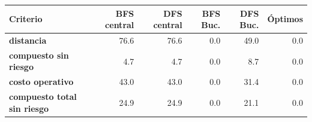 \renewcommand{\arraystretch}{1.2}
\begin{tabular}{|l|r|r|r|r|r|}
\hline
\rowcolor{gray!20} \textbf{Criterio} & \textbf{BFS central} & \textbf{DFS central} & \textbf{BFS Buc.} & \textbf{DFS Buc.} & \textbf{Óptimos} \\
\hline
\textbf{distancia} & 76.6 & 76.6 & 0.0 & 49.0 & 0.0 \\
\hline
\textbf{compuesto sin riesgo} & 4.7 & 4.7 & 0.0 & 8.7 & 0.0 \\
\hline
\textbf{costo operativo} & 43.0 & 43.0 & 0.0 & 31.4 & 0.0 \\
\hline
\textbf{compuesto total sin riesgo} & 24.9 & 24.9 & 0.0 & 21.1 & 0.0 \\
\hline
\end{tabular}
